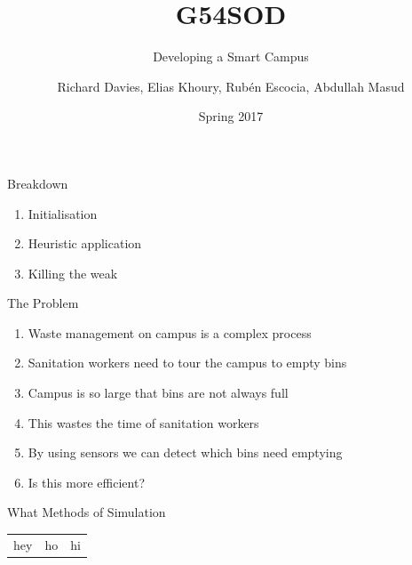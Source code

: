 \documentclass[24pt]{beamer}
\title{G54SOD}
\subtitle{Developing a Smart Campus}
\date{Spring 2017}
\author{Richard Davies, Elias Khoury, Rub\'{e}n Escocia, Abdullah Masud}
\institute{The University of Nottingham}
\begin{document}
    \graphicspath{ {images/} }
    \maketitle

    \begin{frame}{Breakdown}
        \begin{enumerate}
            \item Initialisation
            \item Heuristic application
            \item Killing the weak
        \end{enumerate}
    \end{frame}


    \begin{frame}{The Problem}
        \begin{enumerate}
            \item Waste management on campus is a complex process \pause
            \item Sanitation workers need to tour the campus to empty bins \pause
            \item Campus is so large that bins are not always full \pause
            \item This wastes the time of sanitation workers \pause
            \item By using sensors we can detect which bins need emptying \pause
            \item Is this more efficient?
        \end{enumerate}
    \end{frame}

    \begin{frame}{What Methods of Simulation}
    
        \begin{tabular}{| c | c | c |}
            hey & ho & hi \\
        \end{tabular}
    
    \end{frame}
\end{document}
